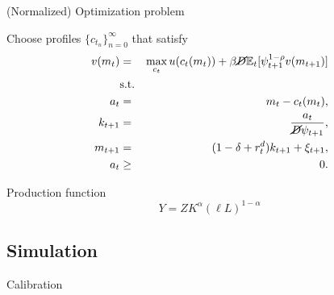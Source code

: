 \documentclass{beamer}
\begin{document}
\footnotesize
\begin{frame}{(Normalized) Optimization problem}

Choose profiles $\{c_{t_n}\}_{n=0}^{\infty}$ that satisfy
 \begin{eqnarray*}
  v(m_t) &=& \max_{c_t} u(c_t(m_t)) + \beta \cancel{D} \mathbb{E}_{t}[\psi_{t+1}^{1-\rho}v(m_{t+1})] \\
  &\text{s.t.}& \\
  a_t &=& m_t - c_t(m_t), \\
  k_{t+1} &=& \frac{a_t}{\cancel{D}\psi_{t+1}}, \\
  m_{t+1} &=& (1 - \delta + r^d_t)k_{t+1} + \xi_{t+1}, \\
  a_t &\geq& 0.
\end{eqnarray*}

Production function $$Y = Z K^{\alpha} (\ell L)^{1-\alpha}$$

\end{frame}

\subsection{Simulation}

\begin{frame}{Calibration}
\vfill
\begin{table}
  \centering
  \scriptsize  %
  
\end{table}
\vfill
\end{frame}


\end{document}

